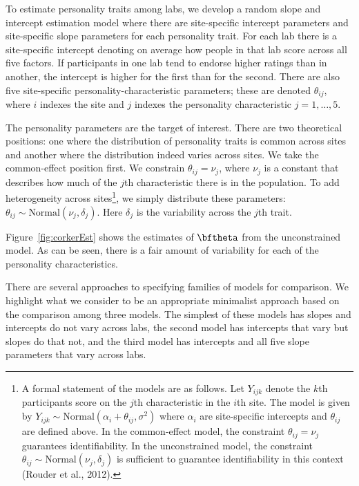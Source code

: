 \documentclass[english,man]{apa6}
\theoremstyle{definition}
\theoremstyle{definition}
\theoremstyle{remark}
\begin{document}
To estimate personality traits among labs, we develop a random slope and
intercept estimation model where there are site-specific intercept
parameters and site-specific slope parameters for each personality
trait. For each lab there is a site-specific intercept denoting on
average how people in that lab score across all five factors. If
participants in one lab tend to endorse higher ratings than in another,
the intercept is higher for the first than for the second. There are
also five site-specific personality-characteristic parameters; these are
denoted \(\theta_{ij}\), where \(i\) indexes the site and \(j\) indexes
the personality characteristic \(j=1,\ldots,5\).

The personality parameters are the target of interest. There are two
theoretical positions: one where the distribution of personality traits
is common across sites and another where the distribution indeed varies
across sites. We take the common-effect position first. We constrain
\(\theta_{ij}=\nu_j\), where \(\nu_j\) is a constant that describes how
much of the \(j\)th characteristic there is in the population. To add
heterogeneity across sites\footnote{A formal statement of the models are
  as follows. Let \(Y_{ijk}\) denote the \(k\)th participants score on
  the \(j\)th characteristic in the \(i\)th site. The model is given by
  \(Y_{ijk} \sim \mbox{Normal}(\alpha_i+\theta_{ij},\sigma^2)\) where
  \(\alpha_i\) are site-specific intercepts and \(\theta_{ij}\) are
  defined above. In the common-effect model, the constraint
  \(\theta_{ij}=\nu_j\) guarantees identifiability. In the unconstrained
  model, the constraint
  \(\theta_{ij} \sim \mbox{Normal}(\nu_j,\delta_j)\) is sufficient to
  guarantee identifiability in this context (Rouder et al., 2012).}, we
simply distribute these parameters:
\(\theta_{ij} \sim \mbox{Normal}(\nu_j,\delta_j)\). Here \(\delta_j\) is
the variability across the \(j\)th trait.

Figure~\ref{fig:corkerEst} shows the estimates of \(\bftheta\) from the
unconstrained model. As can be seen, there is a fair amount of
variability for each of the personality characteristics.

There are several approaches to specifying families of models for
comparison. We highlight what we consider to be an appropriate
minimalist approach based on the comparison among three models. The
simplest of these models has slopes and intercepts do not vary across
labs, the second model has intercepts that vary but slopes do that not,
and the third model has intercepts and all five slope parameters that
vary across labs.
\end{document}
